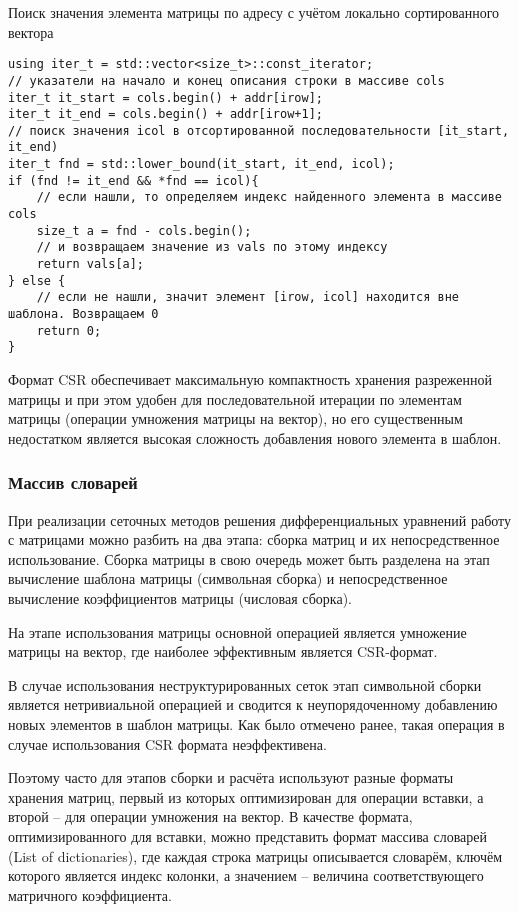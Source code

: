 Поиск значения элемента матрицы по адресу  с учётом локально сортированного вектора 
\begin{verbatim}
using iter_t = std::vector<size_t>::const_iterator;
// указатели на начало и конец описания строки в массиве cols
iter_t it_start = cols.begin() + addr[irow];
iter_t it_end = cols.begin() + addr[irow+1];
// поиск значения icol в отсортированной последовательности [it_start, it_end)
iter_t fnd = std::lower_bound(it_start, it_end, icol);
if (fnd != it_end && *fnd == icol){
	// если нашли, то определяем индекс найденного элемента в массиве cols
	size_t a = fnd - cols.begin();
	// и возвращаем значение из vals по этому индексу
	return vals[a];
} else {
	// если не нашли, значит элемент [irow, icol] находится вне шаблона. Возвращаем 0
	return 0;
}
\end{verbatim}

Формат CSR обеспечивает максимальную компактность хранения
разреженной матрицы и при этом удобен для последовательной итерации по элементам матрицы (операции умножения матрицы на вектор),
но его существенным недостатком является высокая сложность добавления нового элемента в шаблон.

\subsubsection{Массив словарей}
\label{sec:lodmat}
При реализации сеточных методов решения дифференциальных уравнений работу с матрицами
можно разбить на два этапа: сборка матриц и их непосредственное использование.
Сборка матрицы в свою очередь может быть разделена на
этап вычисление шаблона матрицы (символьная сборка) и
непосредственное вычисление коэффициентов матрицы (числовая сборка).

На этапе использования матрицы основной операцией
является умножение матрицы на вектор, где наиболее эффективным является CSR-формат.

В случае использования неструктурированных сеток этап символьной сборки
является нетривиальной операцией и сводится к неупорядоченному добавлению
новых элементов в шаблон матрицы. Как было отмечено ранее, 
такая операция в случае использования CSR формата неэффективена.

Поэтому часто для этапов сборки и расчёта используют
разные форматы хранения матриц, первый из которых оптимизирован для операции вставки, а второй -- для операции умножения на вектор.
В качестве формата, оптимизированного для вставки, можно представить формат массива словарей (List of dictionaries), где каждая строка матрицы
описывается словарём, ключём которого является индекс колонки, а значением -- величина соответствующего матричного коэффициента.

